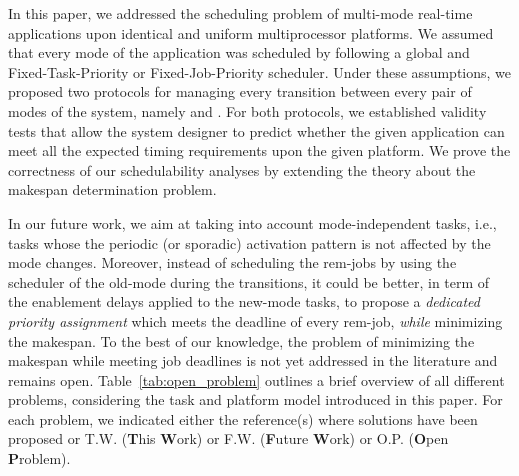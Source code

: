 \documentclass{article}
\newtheorem{validity test}{Validity Test}
\begin{document}
In this paper, we addressed the scheduling problem of multi-mode real-time applications upon identical and uniform multiprocessor platforms. We assumed that every mode of the application was scheduled by following a global and Fixed-Task-Priority or Fixed-Job-Priority scheduler. Under these assumptions, we proposed two protocols for managing every transition between every pair of modes of the system, namely  and . For both protocols, we established validity tests that allow the system designer to predict whether the given application can meet all the expected timing requirements upon the given platform. We prove the correctness of our schedulability analyses by extending the theory about the makespan determination problem. 

In our future work, we aim at taking into account mode-independent tasks, i.e., tasks whose the periodic (or sporadic) activation pattern is not affected by the mode changes. Moreover, instead of scheduling the rem-jobs by using the scheduler of the old-mode during the transitions, it could be better, in term of the enablement delays applied to the new-mode tasks, to propose a \emph{dedicated priority assignment} which meets the deadline of every rem-job, \emph{while} minimizing the makespan. To the best of our knowledge, the problem of minimizing the makespan while meeting job deadlines is not yet addressed in the literature and remains open.  Table~\ref{tab:open_problem} outlines a brief overview of all different problems, considering the task and platform model introduced in this paper. For each problem, we indicated either the reference(s) where solutions have been proposed or T.W. (\textbf{T}his \textbf{W}ork) or F.W. (\textbf{F}uture \textbf{W}ork) or O.P. (\textbf{O}pen \textbf{P}roblem).
\end{document}
